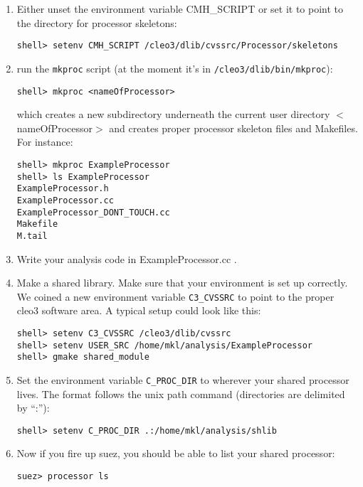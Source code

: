 \documentclass[12pt]{article}
\begin{document}
\begin{enumerate}

\item Either unset the environment variable CMH\_SCRIPT or set it to
 point to the directory for processor skeletons:
%
\begin{verbatim}
shell> setenv CMH_SCRIPT /cleo3/dlib/cvssrc/Processor/skeletons
\end{verbatim}

\item run the \texttt{mkproc} script (at the moment
it's in \texttt{/cleo3/dlib/bin/mkproc}): 
%
\begin{verbatim}
shell> mkproc <nameOfProcessor>
\end{verbatim}
%
which creates a new subdirectory underneath the current user directory
$<$nameOfProcessor$>$ and creates proper processor skeleton files and
Makefiles. 
\newline For instance:
%
\begin{verbatim}
shell> mkproc ExampleProcessor
shell> ls ExampleProcessor
ExampleProcessor.h
ExampleProcessor.cc
ExampleProcessor_DONT_TOUCH.cc
Makefile
M.tail
\end{verbatim}

\item Write your analysis code in ExampleProcessor.cc .

\item Make a shared library. Make sure that your environment is set up
correctly. We coined a new environment variable \texttt{C3\_CVSSRC} to
point to the proper cleo3 software area. A typical setup could look like
this:
%
\begin{verbatim}
shell> setenv C3_CVSSRC /cleo3/dlib/cvssrc
shell> setenv USER_SRC /home/mkl/analysis/ExampleProcessor
shell> gmake shared_module 
\end{verbatim}

\item Set the environment variable \texttt{C\_PROC\_DIR} to wherever your
shared processor lives. The format follows the unix path command
(directories are delimited by ``:''):
%
\begin{verbatim}
shell> setenv C_PROC_DIR .:/home/mkl/analysis/shlib
\end{verbatim}

\item Now if you fire up suez, you should be able to list your shared
processor:
%
\begin{verbatim}
suez> processor ls


\end{verbatim}
\end{enumerate}
\end{document}
